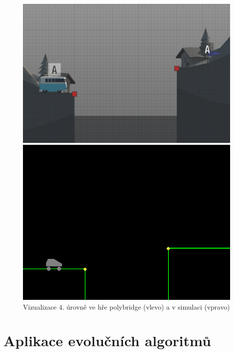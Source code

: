 \begin{figure}[ht]
    \centering
    \begin{minipage}{0.49\textwidth}
        \centering
        \includegraphics[width=\linewidth]{img/poly_lvl4.png}
    \end{minipage}\hfill
    \begin{minipage}{0.49\textwidth}
        \centering
        \includegraphics[width=\linewidth]{img/impl_lvl4.png}
    \end{minipage}
    \caption{Vizualizace $4.$ úrovně ve hře polybridge (vlevo) a v simulaci (vpravo)}
    \label{impl-fig:5}
\end{figure}


\section{Aplikace evolučních algoritmů}

